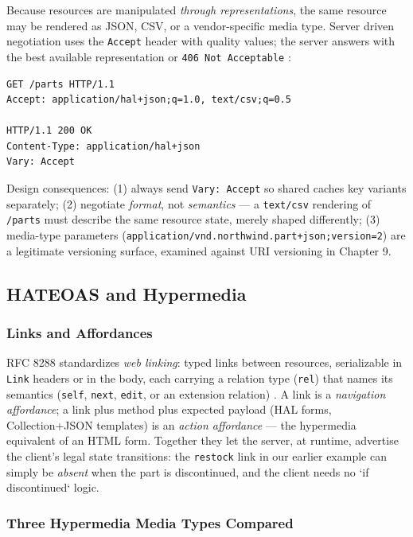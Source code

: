 Because resources are manipulated \emph{through representations}, the same
resource may be rendered as JSON, CSV, or a vendor-specific media type. Server
driven negotiation uses the \texttt{Accept} header with quality values; the
server answers with the best available representation or \texttt{406 Not
Acceptable} \cite{rfc9110}:

\begin{verbatim}
GET /parts HTTP/1.1
Accept: application/hal+json;q=1.0, text/csv;q=0.5

HTTP/1.1 200 OK
Content-Type: application/hal+json
Vary: Accept
\end{verbatim}

Design consequences: (1) always send \texttt{Vary: Accept} so shared caches key
variants separately; (2) negotiate \emph{format}, not \emph{semantics} --- a
\texttt{text/csv} rendering of \texttt{/parts} must describe the same resource
state, merely shaped differently; (3) media-type parameters
(\texttt{application/vnd.northwind.part+json;version=2}) are a legitimate
versioning surface, examined against URI versioning in Chapter 9.

\subsection{HATEOAS and Hypermedia}
\label{sec:ch3-hateoas}

\subsubsection{Links and Affordances}

RFC 8288 standardizes \emph{web linking}: typed links between resources,
serializable in \texttt{Link} headers or in the body, each carrying a relation
type (\texttt{rel}) that names its semantics (\texttt{self}, \texttt{next},
\texttt{edit}, or an extension relation) \cite{rfc8288}. A link is a
\emph{navigation affordance}; a link plus method plus expected payload (HAL
forms, Collection+JSON templates) is an \emph{action affordance} --- the
hypermedia equivalent of an HTML form. Together they let the server, at runtime,
advertise the client's legal state transitions: the \texttt{restock} link in our
earlier example can simply be \emph{absent} when the part is discontinued, and
the client needs no `if discontinued` logic.

\subsubsection{Three Hypermedia Media Types Compared}

